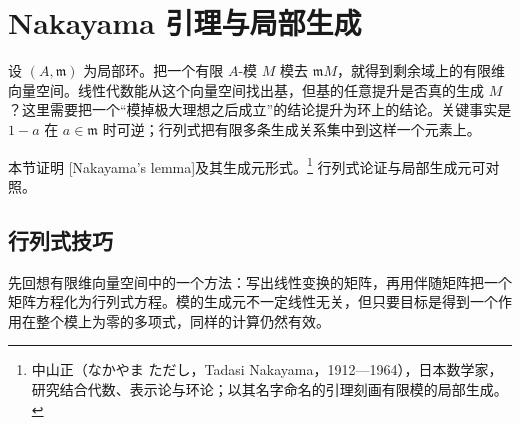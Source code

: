 
% 
% 

\section{Nakayama 引理与局部生成}
\label{g5:sec:0203}

设 \((A,\mathfrak m)\) 为局部环。把一个有限 \(A\)-模 \(M\) 模去 \(\mathfrak mM\)，就得到剩余域上的有限维向量空间。线性代数能从这个向量空间找出基，但基的任意提升是否真的生成 \(M\)？这里需要把一个“模掉极大理想之后成立”的结论提升为环上的结论。关键事实是 \(1-a\) 在 \(a\in\mathfrak m\) 时可逆；行列式把有限多条生成关系集中到这样一个元素上。

\ProseParagraphBreak

本节证明 [Nakayama's lemma]及其生成元形式。\footnote{中山正（なかやま ただし，Tadasi Nakayama，1912—1964），日本数学家，研究结合代数、表示论与环论；以其名字命名的引理刻画有限模的局部生成。} 行列式论证与局部生成元可对照\cite[第2节，定理2.1--2.3]{Matsumura1989}。

\subsection{行列式技巧}
\label{g5:subsec:0203:01}

先回想有限维向量空间中的一个方法：写出线性变换的矩阵，再用伴随矩阵把一个矩阵方程化为行列式方程。模的生成元不一定线性无关，但只要目标是得到一个作用在整个模上为零的多项式，同样的计算仍然有效。

